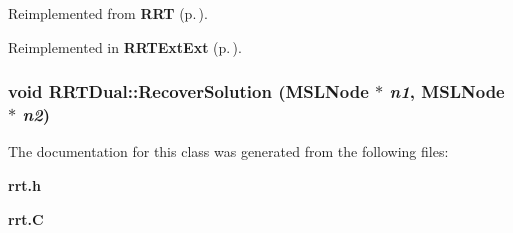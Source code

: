 Reimplemented from {\bf RRT} {\rm (p.\,\pageref{classRRT_a3})}.

Reimplemented in {\bf RRTExt\-Ext} {\rm (p.\,\pageref{classRRTExtExt_a2})}.
\subsubsection{\setlength{\rightskip}{0pt plus 5cm}void RRTDual::Recover\-Solution ({\bf MSLNode} $\ast$ {\em n1}, {\bf MSLNode} $\ast$ {\em n2})\hspace{0.3cm}{\tt  [protected]}}\label{classRRTDual_b0}




The documentation for this class was generated from the following files:\begin{CompactItemize}
\item 
{\bf rrt.h}\item 
{\bf rrt.C}\end{CompactItemize}
